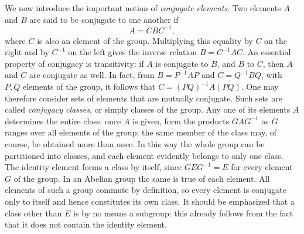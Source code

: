 We now introduce the important notion of \emph{conjugate elements}.  Two 
elements $A$ and $B$ are said to be conjugate to one another if
\[
A=CBC^{-1},
\]
where $C$ is also an element of the group.  Multiplying this equality by $C$ 
on the right and by $C^{-1}$ on the left gives the inverse relation 
$B=C^{-1}AC$.  An essential property of conjugacy is transitivity: if $A$ is 
conjugate to $B$, and $B$ to $C$, then $A$ and $C$ are conjugate as well.  In 
fact, from $B=P^{-1}AP$ and $C=Q^{-1}BQ$, with $P,Q$ elements of the group, it 
follows that $C=(PQ)^{-1}A(PQ)$.  One may therefore consider sets of elements 
that are mutually conjugate.  Such sets are called \emph{conjugacy classes}, 
or simply classes of the group.  Any one of its elements $A$ determines the 
entire class: once $A$ is given, form the products $GAG^{-1}$ as $G$ ranges 
over all elements of the group; the same member of the class may, of course, 
be obtained more than once.  In this way the whole group can be partitioned 
into classes, and each element evidently belongs to only one class.
The identity element forms a class by itself, since $GEG^{-1}=E$ for every 
element $G$ of the group.  In an Abelian group the same is true of each 
element.  All elements of such a group commute by definition, so every 
element is conjugate only to itself and hence constitutes its own class.  It 
should be emphasized that a class other than $E$ is by no means a subgroup: 
this already follows from the fact that it does not contain the identity 
element.
